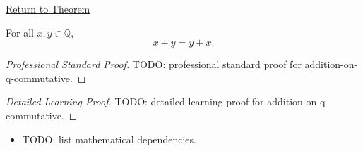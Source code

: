 \newpage
{}
\label{prf:addition-on-q-commutative}

\begin{remark*}[Return]
\hyperref[thm:addition-on-q-commutative]{Return to Theorem}
\end{remark*}

\begin{theorem*}
For all $x,y\in\mathbb{Q}$,
\[
x+y=y+x.
\]
\end{theorem*}

\begin{proof}[Professional Standard Proof]
\LRAProofBodyStart
TODO: professional standard proof for addition-on-q-commutative.
\end{proof}

\begin{proof}[Detailed Learning Proof]
\LRAProofBodyStart
TODO: detailed learning proof for addition-on-q-commutative.
\end{proof}

\begin{remark*}
\end{remark*}

\begin{dependencies}
\begin{itemize}
  \item TODO: list mathematical dependencies.
\end{itemize}
\end{dependencies}

\clearpage
